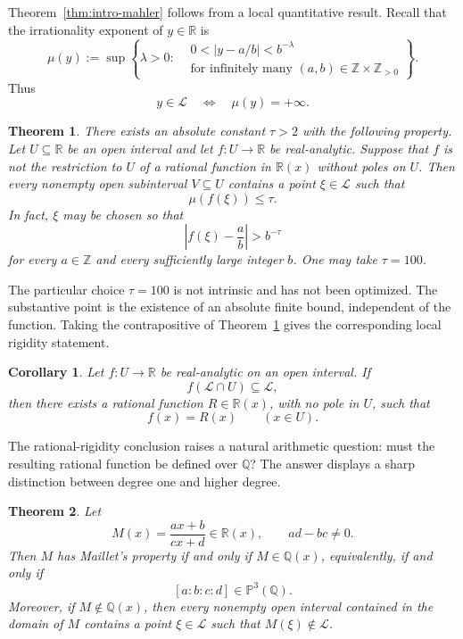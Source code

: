 \documentclass[11pt]{amsart}
\numberwithin{equation}{section}
\newtheorem{theorem}{Theorem}[section]
\newtheorem{corollary}[corollary]{Corollary}
\theoremstyle{definition}
\theoremstyle{remark}
\newcommand{\R}{\mathbb R}
\newcommand{\Q}{\mathbb Q}
\newcommand{\Z}{\mathbb Z}
\newcommand{\Lio}{\mathscr L}
\newcommand{\abs}[1]{\left\lvert #1\right\rvert}
\begin{document}
Theorem~\ref{thm:intro-mahler} follows from a local quantitative
result. Recall that the irrationality exponent of
$y\in\mathbb R$ is
\begin{equation}\label{eq:intro-mu}
\mu(y):=
\sup\left\{
\lambda>0:
\begin{aligned}
&0<\abs{y-a/b}<b^{-\lambda}\\
&\text{for infinitely many }(a,b)\in\Z\times\Z_{>0}
\end{aligned}
\right\}.
\end{equation}
Thus
\[
y\in\Lio\quad\Longleftrightarrow\quad\mu(y)=+\infty.
\]

\begin{theorem}\label{thm:intro-local}
There exists an absolute constant $\tau>2$ with the following property.
Let $U\subseteq\mathbb R$ be an open interval and let
$f:U\to\mathbb R$ be real-analytic. Suppose that $f$ is not the
restriction to $U$ of a rational function in $\mathbb R(x)$ without
poles on $U$. Then every nonempty open subinterval $V\subseteq U$
contains a point $\xi\in\Lio$ such that
\[
\mu(f(\xi))\leq\tau.
\]
In fact, $\xi$ may be chosen so that
\[
\left|f(\xi)-\frac{a}{b}\right|>b^{-\tau}
\]
for every $a\in\mathbb Z$ and every sufficiently large integer $b$.
One may take $\tau=100$.
\end{theorem}

The particular choice $\tau=100$ is not intrinsic and has not been
optimized. The substantive point is the existence of an absolute
finite bound, independent of the function. Taking the contrapositive of
Theorem~\ref{thm:intro-local} gives the corresponding local rigidity
statement.

\begin{corollary}\label{cor:intro-rigidity}
Let $f:U\to\R$ be real-analytic on an open interval. If
\[
f(\Lio\cap U)\subseteq\Lio,
\]
then there exists a rational function $R\in\R(x)$, with no pole in $U$,
such that
\[
f(x)=R(x)\qquad(x\in U).
\]
\end{corollary}

The rational-rigidity conclusion raises a natural arithmetic question:
must the resulting rational function be defined over $\Q$?  The answer
displays a sharp distinction between degree one and higher degree.

\begin{theorem}\label{thm:intro-mobius}
Let
\[
M(x)=\frac{ax+b}{cx+d}\in\R(x),
\qquad ad-bc\neq0.
\]
Then $M$ has Maillet's property if and only if $M\in\Q(x)$,
equivalently, if and only if
\[
[a:b:c:d]\in\mathbb P^3(\Q).
\]
Moreover, if $M\notin\Q(x)$, then every nonempty open interval
contained in the domain of $M$ contains a point $\xi\in\Lio$ such that
$M(\xi)\notin\Lio$.
\end{theorem}
\end{document}
